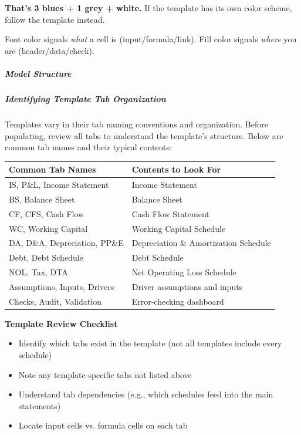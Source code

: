 \documentclass[11pt]{article}
\begin{document}
\textbf{That's 3 blues + 1 grey + white.} If the template has its own color scheme, follow the template instead.


Font color signals \emph{what} a cell is (input/formula/link). Fill color signals \emph{where} you are (header/data/check).


\subparagraph{Model Structure}\mbox{}\par

\subparagraph{Identifying Template Tab Organization}\mbox{}\par

Templates vary in their tab naming conventions and organization. Before populating, review all tabs to understand the template's structure. Below are common tab names and their typical contents:


\begingroup
\small
\setlength{\tabcolsep}{2pt}
\begin{longtable}{>{\RaggedRight\arraybackslash\hspace{0pt}}p{}>{\RaggedRight\arraybackslash\hspace{0pt}}p{}}
\toprule
{} \textbf{Common Tab Names} & \textbf{Contents to Look For} \\
\midrule
{} IS, P\&L, Income Statement & Income Statement \\
{} BS, Balance Sheet & Balance Sheet \\
{} CF, CFS, Cash Flow & Cash Flow Statement \\
{} WC, Working Capital & Working Capital Schedule \\
{} DA, D\&A, Depreciation, PP\&E & Depreciation \& Amortization Schedule \\
{} Debt, Debt Schedule & Debt Schedule \\
{} NOL, Tax, DTA & Net Operating Loss Schedule \\
{} Assumptions, Inputs, Drivers & Driver assumptions and inputs \\
{} Checks, Audit, Validation & Error-checking dashboard \\
\bottomrule
\end{longtable}
\endgroup

\textbf{Template Review Checklist}

\begin{itemize}[leftmargin=*,itemsep=2pt,topsep=2pt]
\item {} Identify which tabs exist in the template (not all templates include every schedule)
\item {} Note any template-specific tabs not listed above
\item {} Understand tab dependencies (e.g., which schedules feed into the main statements)
\item {} Locate input cells vs. formula cells on each tab
\end{itemize}
\end{document}
